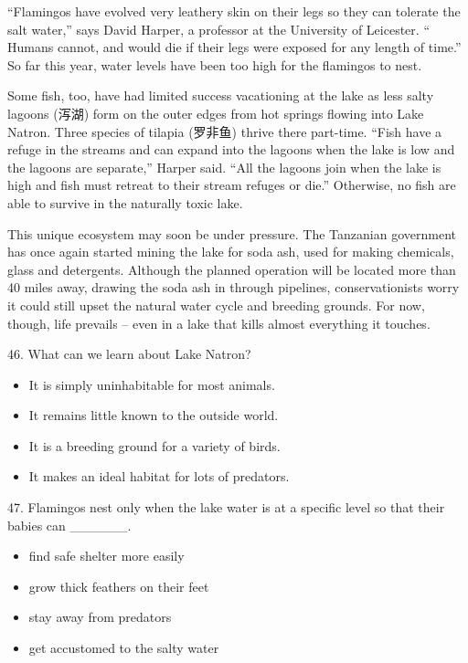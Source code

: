 \documentclass[UTF8,11pt]{ctexart}
\begin{document}
“Flamingos have evolved very leathery skin on their legs so they can tolerate the salt water,” says David Harper, a professor at the University of Leicester. “ Humans cannot, and would die if their legs were exposed for any length of time.” So far this year, water levels have been too high for the flamingos to nest.


Some fish, too, have had limited success vacationing at the lake as less salty lagoons (泻湖) form on the outer edges from hot springs flowing into Lake Natron. Three species of tilapia (罗非鱼) thrive there part-time. “Fish have a refuge in the streams and can expand into the lagoons when the lake is low and the lagoons are separate,” Harper said. “All the lagoons join when the lake is high and fish must retreat to their stream refuges or die.” Otherwise, no fish are able to survive in the naturally toxic lake.


This unique ecosystem may soon be under pressure. The Tanzanian government has once again started mining the lake for soda ash, used for making chemicals, glass and detergents. Although the planned operation will be located more than 40 miles away, drawing the soda ash in through pipelines, conservationists worry it could still upset the natural water cycle and breeding grounds. For now, though, life prevails – even in a lake that kills almost everything it touches.


46. What can we learn about Lake Natron?


\begin{itemize}[leftmargin=2em,itemsep=.2em,topsep=.4em]\item[A.] It is simply uninhabitable for most animals.
\item[B.] It remains little known to the outside world.
\item[C.] It is a breeding ground for a variety of birds.
\item[D.] It makes an ideal habitat for lots of predators.
\end{itemize}

47. Flamingos nest only when the lake water is at a specific level so that their babies can \_\_\_\_\_\_.


\begin{itemize}[leftmargin=2em,itemsep=.2em,topsep=.4em]\item[A.] find safe shelter more easily
\item[B.] grow thick feathers on their feet
\item[C.] stay away from predators
\item[D.] get accustomed to the salty water
\end{itemize}
\end{document}
